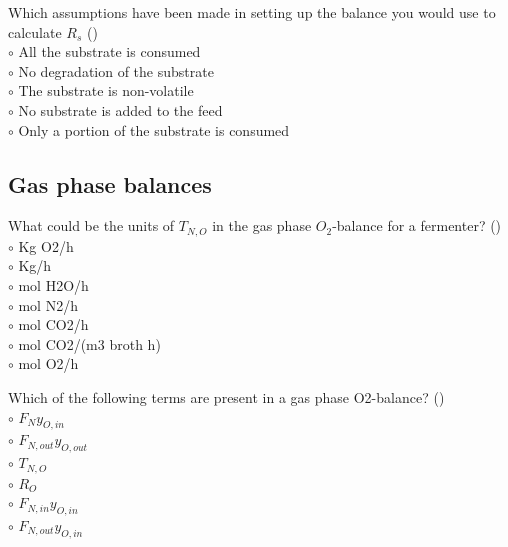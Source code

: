 \documentclass[]{beamer}
\begin{document}
\begin{frame}[shrink] {}
\addtocounter{questions}{1}
\color{blue}
Which assumptions have been made in setting up the balance you would use to calculate $R_s$ ()\\
\color{black}
\setlength{\parindent}{-0.4cm}
{\color{red}$\circ$}   All the substrate is consumed  \\
{\color{red}$\circ$} No degradation of the substrate   \\
{\color{red}$\circ$} The substrate is non-volatile   \\
{\color{red}$\circ$} No substrate is added to the feed  \\
{\color{red}$\circ$} Only a portion of the substrate is consumed
\end{frame}

\subsection{Gas phase balances}
\setcounter{questions}{0}

\begin{frame}[shrink] {}
\addtocounter{questions}{1}
\color{blue}
What could be the units of $T_{N,O}$ in the gas phase $O_2$-balance for a fermenter? ()\\
\color{black}
\setlength{\parindent}{-0.4cm}
{\color{red}$\circ$} Kg O2/h  \\
{\color{red}$\circ$} Kg/h  \\
{\color{red}$\circ$} mol H2O/h\\
{\color{red}$\circ$} mol N2/h  \\
{\color{red}$\circ$} mol CO2/h \\
{\color{red}$\circ$} mol CO2/(m3 broth h) \\
{\color{red}$\circ$} mol O2/h
\end{frame}

\begin{frame}[shrink] {}
\addtocounter{questions}{1}
\color{blue}
Which of the following terms are present in a gas phase O2-balance?  ()\\
\color{black}
\setlength{\parindent}{-0.4cm}
{\color{red}$\circ$}   $F_{N}y_{O,in}$\\   
{\color{red}$\circ$}   $F_{N,out}y_{O,out}$\\   
{\color{red}$\circ$} $T_{N,O}$\\
{\color{red}$\circ$} $R_O$\\
{\color{red}$\circ$}   $F_{N,in}y_{O,in}$  \\ 
{\color{red}$\circ$}   $F_{N,out}y_{O,in}$   
\end{frame}
\end{document}
